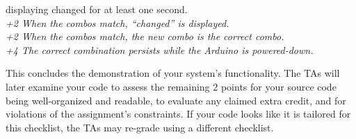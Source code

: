 \begin{enumerate}
{    displaying {\dviiseg changed} for at least one second.} \\
    \textit{+2 When the combos match, ``changed'' is displayed.}
 \\
    \textit{+2 When the combos match, the new combo is the correct combo.}
 \\
    \textit{+4 The correct combination persists while the Arduino is
    powered-down.}
\end{enumerate}

This concludes the demonstration of your system's functionality. The TAs will
later examine your code to assess the remaining 2 points for your source code
being well-organized and readable, to evaluate any claimed extra credit, and
for violations of the assignment's constraints. If your code looks like it is
tailored for this checklist, the TAs may re-grade using a different checklist.

